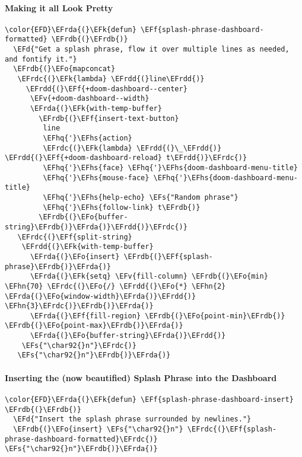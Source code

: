 \documentclass{article}
\newcommand{\EFs}[1]{\textcolor{EFs}{#1}} %
\newcommand{\EFd}[1]{\textcolor{EFd}{#1}} %
\newcommand{\EFk}[1]{\textcolor{EFk}{#1}} %
\newcommand{\EFf}[1]{\textcolor{EFf}{#1}} %
\newcommand{\EFv}[1]{\textcolor{EFv}{#1}} %
\newcommand{\EFo}[1]{\textcolor{EFo}{#1}} %
\newcommand{\EFhn}[1]{\textcolor{EFhn}{\textbf{#1}}} %
\newcommand{\EFhq}[1]{#1} %
\newcommand{\EFhs}[1]{\textcolor{EFhs}{#1}} %
\newcommand{\EFrda}[1]{\textcolor{EFrda}{#1}} %
\newcommand{\EFrdb}[1]{\textcolor{EFrdb}{#1}} %
\newcommand{\EFrdc}[1]{\textcolor{EFrdc}{#1}} %
\newcommand{\EFrdd}[1]{\textcolor{EFrdd}{#1}} %
\begin{document}
\paragraph{Making it all Look Pretty}
\label{sec:orgb2f5db8}
\begin{Code}
\begin{Verbatim}
\color{EFD}\EFrda{(}\EFk{defun} \EFf{splash-phrase-dashboard-formatted} \EFrdb{(}\EFrdb{)}
  \EFd{"Get a splash phrase, flow it over multiple lines as needed, and fontify it."}
  \EFrdb{(}\EFo{mapconcat}
   \EFrdc{(}\EFk{lambda} \EFrdd{(}line\EFrdd{)}
     \EFrdd{(}\EFf{+doom-dashboard--center}
      \EFv{+doom-dashboard--width}
      \EFrda{(}\EFk{with-temp-buffer}
        \EFrdb{(}\EFf{insert-text-button}
         line
         \EFhq{'}\EFhs{action}
         \EFrdc{(}\EFk{lambda} \EFrdd{(}\_\EFrdd{)} \EFrdd{(}\EFf{+doom-dashboard-reload} t\EFrdd{)}\EFrdc{)}
         \EFhq{'}\EFhs{face} \EFhq{'}\EFhs{doom-dashboard-menu-title}
         \EFhq{'}\EFhs{mouse-face} \EFhq{'}\EFhs{doom-dashboard-menu-title}
         \EFhq{'}\EFhs{help-echo} \EFs{"Random phrase"}
         \EFhq{'}\EFhs{follow-link} t\EFrdb{)}
        \EFrdb{(}\EFo{buffer-string}\EFrdb{)}\EFrda{)}\EFrdd{)}\EFrdc{)}
   \EFrdc{(}\EFf{split-string}
    \EFrdd{(}\EFk{with-temp-buffer}
      \EFrda{(}\EFo{insert} \EFrdb{(}\EFf{splash-phrase}\EFrdb{)}\EFrda{)}
      \EFrda{(}\EFk{setq} \EFv{fill-column} \EFrdb{(}\EFo{min} \EFhn{70} \EFrdc{(}\EFo{/} \EFrdd{(}\EFo{*} \EFhn{2} \EFrda{(}\EFo{window-width}\EFrda{)}\EFrdd{)} \EFhn{3}\EFrdc{)}\EFrdb{)}\EFrda{)}
      \EFrda{(}\EFf{fill-region} \EFrdb{(}\EFo{point-min}\EFrdb{)} \EFrdb{(}\EFo{point-max}\EFrdb{)}\EFrda{)}
      \EFrda{(}\EFo{buffer-string}\EFrda{)}\EFrdd{)}
    \EFs{"\char92{}n"}\EFrdc{)}
   \EFs{"\char92{}n"}\EFrdb{)}\EFrda{)}
\end{Verbatim}
\end{Code}
\paragraph{Inserting the (now beautified) Splash Phrase into the Dashboard}
\label{sec:org2e48bed}
\begin{Code}
\begin{Verbatim}
\color{EFD}\EFrda{(}\EFk{defun} \EFf{splash-phrase-dashboard-insert} \EFrdb{(}\EFrdb{)}
  \EFd{"Insert the splash phrase surrounded by newlines."}
  \EFrdb{(}\EFo{insert} \EFs{"\char92{}n"} \EFrdc{(}\EFf{splash-phrase-dashboard-formatted}\EFrdc{)} \EFs{"\char92{}n"}\EFrdb{)}\EFrda{)}
\end{Verbatim}
\end{Code}
\end{document}
